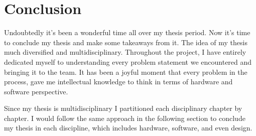 \chapter*{Conclusion}
Undoubtedly it's been a wonderful time all over my thesis period. Now it's time to conclude my thesis and make some takeaways from it. The idea of my thesis much diversified and multidisciplinary. Throughout the project, I have entirely dedicated myself to understanding every problem statement we encountered and bringing it to the team. It has been a joyful moment that every problem in the process, gave me intellectual knowledge to think in terms of hardware and software perspective.

Since my thesis is multidisciplinary I partitioned each disciplinary chapter by chapter. I would follow the same approach in the following section to conclude my thesis in each discipline, which includes hardware, software, and even design.

